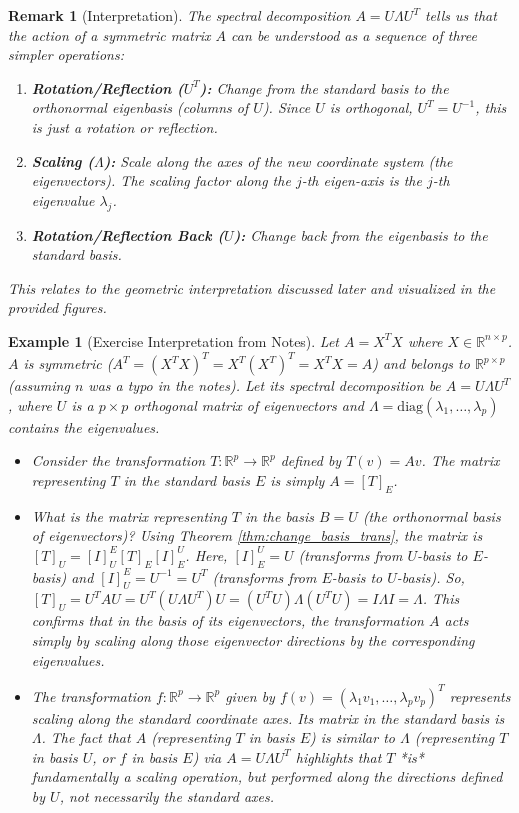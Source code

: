 \documentclass[11pt, a4paper]{article}
\theoremstyle{mydefinitionstyle}
\newtheorem{example}{Example}[section]
\newtheorem{remark}{Remark}[section]
\theoremstyle{mytheoremstyle}
\newcommand{\R}{\mathbb{R}}
\begin{document}
\begin{remark}[Interpretation] \label{rem:spectral_interp}
    The spectral decomposition $A = U \Lambda U^T$ tells us that the action of a symmetric matrix $A$ can be understood as a sequence of three simpler operations:
    \begin{enumerate}
        \item \textbf{Rotation/Reflection ($U^T$):} Change from the standard basis to the orthonormal eigenbasis (columns of $U$). Since $U$ is orthogonal, $U^T = U^{-1}$, this is just a rotation or reflection.
        \item \textbf{Scaling ($\Lambda$):} Scale along the axes of the new coordinate system (the eigenvectors). The scaling factor along the $j$-th eigen-axis is the $j$-th eigenvalue $\lambda_j$.
        \item \textbf{Rotation/Reflection Back ($U$):} Change back from the eigenbasis to the standard basis.
    \end{enumerate}
    This relates to the geometric interpretation discussed later and visualized in the provided figures.
\end{remark}

\begin{example}[Exercise Interpretation from Notes] \label{ex:exercise_interp}
    Let $A = X^T X$ where $X \in \R^{n \times p}$. $A$ is symmetric ($A^T = (X^T X)^T = X^T (X^T)^T = X^T X = A$) and belongs to $\R^{p \times p}$ (assuming $n$ was a typo in the notes). Let its spectral decomposition be $A = U \Lambda U^T$, where $U$ is a $p \times p$ orthogonal matrix of eigenvectors and $\Lambda = \text{diag}(\lambda_1, \dots, \lambda_p)$ contains the eigenvalues.
    \begin{itemize}
        \item Consider the transformation $T: \R^p \to \R^p$ defined by $T(v) = Av$. The matrix representing $T$ in the standard basis $E$ is simply $A = [T]_E$.
        \item What is the matrix representing $T$ in the basis $B=U$ (the orthonormal basis of eigenvectors)? Using Theorem \ref{thm:change_basis_trans}, the matrix is $[T]_U = [I]_U^E [T]_E [I]_E^U$. Here, $[I]_E^U = U$ (transforms from $U$-basis to $E$-basis) and $[I]_U^E = U^{-1} = U^T$ (transforms from $E$-basis to $U$-basis). So, $[T]_U = U^T A U = U^T (U \Lambda U^T) U = (U^T U) \Lambda (U^T U) = I \Lambda I = \Lambda$. This confirms that in the basis of its eigenvectors, the transformation $A$ acts simply by scaling along those eigenvector directions by the corresponding eigenvalues.
        \item The transformation $f: \R^p \to \R^p$ given by $f(v) = (\lambda_1 v_1, \dots, \lambda_p v_p)^T$ represents scaling along the standard coordinate axes. Its matrix in the standard basis is $\Lambda$. The fact that $A$ (representing $T$ in basis $E$) is similar to $\Lambda$ (representing $T$ in basis $U$, or $f$ in basis $E$) via $A = U \Lambda U^T$ highlights that $T$ *is* fundamentally a scaling operation, but performed along the directions defined by $U$, not necessarily the standard axes.
    \end{itemize}
\end{example}
\end{document}
